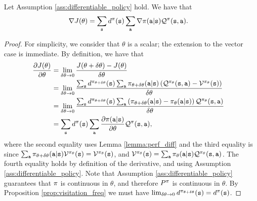 \begin{theorem}\label{thm:policy_gradient_direct}
    Let Assumption \ref{ass:differentiable_policy} hold. We have that
    \begin{equation*}
        \nabla J(\theta) = \sum_{{\tt s}} d^{\pi}({\tt s}) \sum_{\tt a} \nabla \pi({\tt a}|{\tt s})\mathcal{Q}^{\pi}({\tt s},{\tt a}).
    \end{equation*}
\end{theorem}
\begin{proof}
    For simplicity, we consider that $\theta$ is a scalar; the extension to the vector case is immediate.
    By definition, we have that
    \begin{equation*}
        \begin{split}
            \frac{\partial J(\theta)}{\partial \theta} &= \lim_{\delta \theta \to 0} \frac{J(\theta+ \delta \theta) - J(\theta)}{\delta \theta} \\
            &=\lim_{\delta \theta \to 0} \frac{\sum_{{\tt s}} d^{\pi_{\theta+ \delta \theta}}({\tt s}) \sum_{\tt a} \pi_{\theta+ \delta \theta}({\tt a}|{\tt s})\left( \mathcal{Q}^{\pi_{\theta}}({\tt s},{\tt a}) - \mathcal{V}^{\pi_{\theta}}({\tt s})\right)}{\delta \theta}\\
            &= \lim_{\delta \theta \to 0} \frac{\sum_{{\tt s}} d^{\pi_{\theta+ \delta \theta}}({\tt s}) \sum_{\tt a} \left(\pi_{\theta+ \delta \theta}({\tt a}|{\tt s}) - \pi_{\theta}({\tt a}|{\tt s})\right) \mathcal{Q}^{\pi_{\theta}}({\tt s},{\tt a})}{\delta \theta}\\
            &= \sum_{{\tt s}} d^{\pi}({\tt s}) \sum_{\tt a} \frac{\partial \pi({\tt a}|{\tt s})}{\partial \theta} \mathcal{Q}^{\pi}({\tt s},{\tt a}),
        \end{split}
    \end{equation*}
\sloppy where the second equality uses Lemma \ref{lemma:perf_diff} and the third equality is since $\sum_{\tt a} \pi_{\theta+ \delta \theta}({\tt a}|{\tt s})\mathcal{V}^{\pi_{\theta}}({\tt s}) = \mathcal{V}^{\pi_{\theta}}({\tt s})$, and $\mathcal{V}^{\pi_{\theta}}({\tt s}) = \sum_{{\tt a}} \pi_{\theta}({\tt a}|{\tt s}) \mathcal{Q}^{\pi_{\theta}}({\tt s},{\tt a})$. The fourth equality holds by definition of the derivative, and using Assumption \ref{ass:differentiable_policy}. Note that Assumption \ref{ass:differentiable_policy} guarantees that $\pi$ is continuous in $\theta$, and therefore $P^{\pi}$ is continuous in $\theta$. By Proposition \ref{prop:visitation_freq} we must have $\lim_{\delta \theta \to 0} d^{\pi_{\theta+ \delta \theta}}({\tt s}) = d^{\pi}({\tt s})$.
\end{proof}

